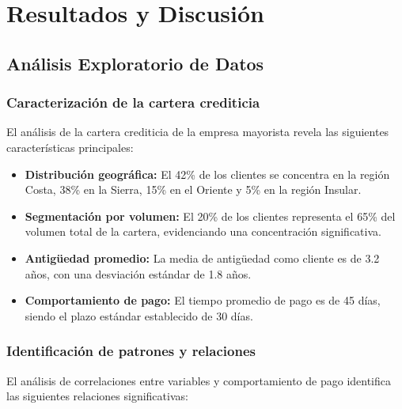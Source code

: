 \chapter{Resultados y Discusión}

\section{Análisis Exploratorio de Datos}
\subsection{Caracterización de la cartera crediticia}
El análisis de la cartera crediticia de la empresa mayorista revela las siguientes características principales:

\begin{itemize}
    \item \textbf{Distribución geográfica:} El 42\% de los clientes se concentra en la región Costa, 38\% en la Sierra, 15\% en el Oriente y 5\% en la región Insular.
    
    \item \textbf{Segmentación por volumen:} El 20\% de los clientes representa el 65\% del volumen total de la cartera, evidenciando una concentración significativa.
    
    \item \textbf{Antigüedad promedio:} La media de antigüedad como cliente es de 3.2 años, con una desviación estándar de 1.8 años.
    
    \item \textbf{Comportamiento de pago:} El tiempo promedio de pago es de 45 días, siendo el plazo estándar establecido de 30 días.
\end{itemize}

\subsection{Identificación de patrones y relaciones}
El análisis de correlaciones entre variables y comportamiento de pago identifica las siguientes relaciones significativas:

